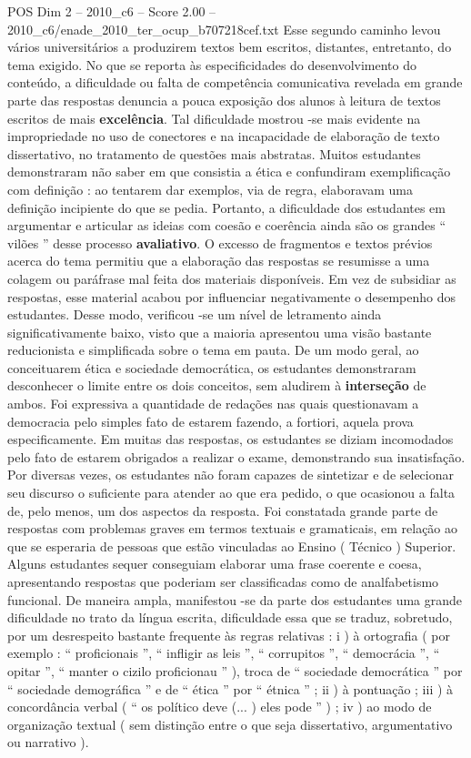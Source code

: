 \begin{textsample}{POS Dim 2 – 2010\_c6 – Score 2.00 – 2010\_c6/enade\_2010\_ter\_ocup\_b707218cef.txt}
Esse segundo caminho levou vários universitários a produzirem textos bem escritos, distantes, entretanto, do tema exigido.
No que se reporta às especificidades do desenvolvimento do conteúdo, a dificuldade ou falta de competência comunicativa revelada em grande parte das respostas denuncia a pouca exposição dos alunos à leitura de textos escritos de mais \textbf{excelência}.
Tal dificuldade mostrou -se mais evidente na impropriedade no uso de conectores e na incapacidade de elaboração de texto dissertativo, no tratamento de questões mais abstratas.
Muitos estudantes demonstraram não saber em que consistia a ética e confundiram exemplificação com definição : ao tentarem dar exemplos, via de regra, elaboravam uma definição incipiente do que se pedia.
Portanto, a dificuldade dos estudantes em argumentar e articular as ideias com coesão e coerência ainda são os grandes “ vilões ” desse processo \textbf{avaliativo}.
O excesso de fragmentos e textos prévios acerca do tema permitiu que a elaboração das respostas se resumisse a uma colagem ou paráfrase mal feita dos materiais disponíveis.
Em vez de subsidiar as respostas, esse material acabou por influenciar negativamente o desempenho dos estudantes.
Desse modo, verificou -se um nível de letramento ainda significativamente baixo, visto que a maioria apresentou uma visão bastante reducionista e simplificada sobre o tema em pauta.
De um modo geral, ao conceituarem ética e sociedade democrática, os estudantes demonstraram desconhecer o limite entre os dois conceitos, sem aludirem à \textbf{interseção} de ambos.
Foi expressiva a quantidade de redações nas quais questionavam a democracia pelo simples fato de estarem fazendo, a fortiori, aquela prova especificamente.
Em muitas das respostas, os estudantes se diziam incomodados pelo fato de estarem obrigados a realizar o exame, demonstrando sua insatisfação.
Por diversas vezes, os estudantes não foram capazes de sintetizar e de selecionar seu discurso o suficiente para atender ao que era pedido, o que ocasionou a falta de, pelo menos, um dos aspectos da resposta.
Foi constatada grande parte de respostas com problemas graves em termos textuais e gramaticais, em relação ao que se esperaria de pessoas que estão vinculadas ao Ensino ( Técnico ) Superior.
Alguns estudantes sequer conseguiam elaborar uma frase coerente e coesa, apresentando respostas que poderiam ser classificadas como de analfabetismo funcional.
De maneira ampla, manifestou -se da parte dos estudantes uma grande dificuldade no trato da língua escrita, dificuldade essa que se traduz, sobretudo, por um desrespeito bastante frequente às regras relativas : i ) à ortografia ( por exemplo : “ proficionais ”, “ infligir as leis ”, “ corrupitos ”, “ democrácia ”, “ opitar ”, “ manter o cizilo proficionau ” ), troca de “ sociedade democrática ” por “ sociedade demográfica ” e de “ ética ” por “ étnica ” ; ii ) à pontuação ; iii ) à concordância verbal ( “ os político deve (... ) eles pode ” ) ; iv ) ao modo de organização textual ( sem distinção entre o que seja dissertativo, argumentativo ou narrativo ).

\end{textsample}
